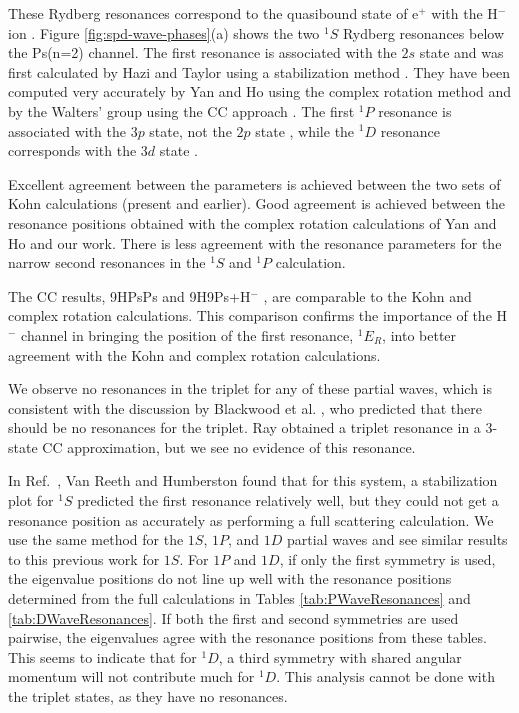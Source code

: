 \documentclass[preprint,showpacs,showkeys,preprintnumbers,amsmath,amssymb,longbibliography,pra,aps]{revtex4-1}
\begin{document}
These Rydberg resonances correspond to the quasibound state of e$^+$ with the 
H$^-$ ion \cite{Drachman1979}. Figure \ref{fig:spd-wave-phases}(a) shows the 
two $^1S$ Rydberg resonances below the Ps(n=2) channel. The first resonance 
is associated with the $2s$ state \cite{DiRienzi2002b} and was first 
calculated by Hazi and Taylor using a stabilization method \cite{Hazi1970}. 
They have been computed very accurately by Yan and Ho using the complex 
rotation method \cite{Yan1999} and by the Walters' group using the CC 
approach \cite{Walters2004}. The first $^1P$ resonance is associated with the 
$3p$ state, not the $2p$ state \cite{DiRienzi2002b}, while the $^1D$ 
resonance corresponds with the $3d$ state \cite{DiRienzi2002a}.

Excellent agreement between the parameters is achieved between the two sets 
of Kohn calculations (present and earlier). Good agreement is achieved 
between the resonance positions obtained with the complex rotation 
calculations of Yan and Ho \cite{Yan1999,Yan1998a,Ho1998,Ho2000} and our 
work. There is less agreement with the resonance parameters for the narrow 
second resonances in the $^1S$ and $^1P$ calculation.

The CC results, 9HPsPs \cite{Blackwood2002} and 9H9Ps+H$^-$ \cite{Walters2004},
are comparable to the Kohn and complex rotation calculations. This 
comparison confirms the importance of the H$^-$ channel in bringing the 
position of the first resonance, $^1E_R$, into better agreement with the Kohn 
and complex rotation calculations.

We observe no resonances in the triplet for any of these partial waves, which 
is consistent with the discussion by Blackwood et al. \cite{Blackwood2002}, 
who predicted that there should be no resonances for the triplet. Ray
\cite{Ray2006} obtained a triplet resonance in a 3-state CC approximation, but
we see no evidence of this resonance.

In Ref.~\cite{VanReeth2004}, Van Reeth and Humberston found that for this 
system, a stabilization plot for $^1S$ predicted the first resonance 
relatively well, but they could not get a resonance position as accurately as 
performing a full scattering calculation. We use the same method for the $1S$,
$1P$, and $1D$ partial waves and see similar results to this previous work 
for $1S$. For $1P$ and $1D$, if only the first symmetry is used, the 
eigenvalue positions do not line up well with the resonance positions 
determined from the full calculations in Tables \ref{tab:PWaveResonances} and 
\ref{tab:DWaveResonances}. If both the first and second symmetries are used 
pairwise, the eigenvalues agree with the resonance positions from these 
tables. This seems to indicate that for $^1D$, a third symmetry with shared 
angular momentum will not contribute much for $^1D$. This analysis cannot be 
done with the triplet states, as they have no resonances.
\end{document}
